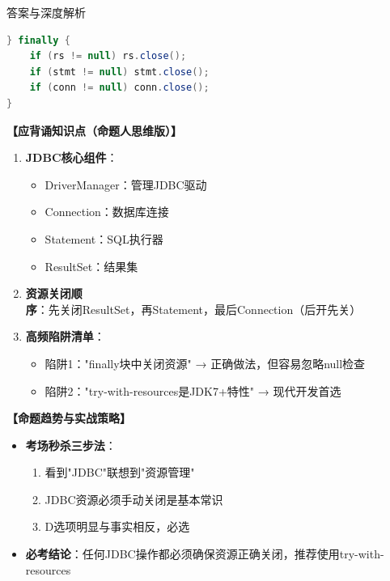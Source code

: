 \documentclass[12pt, a4paper]{ctexart}
\begin{document}
\begin{enumerate}[label=\textbf{\arabic*.}]
\begin{bluebox}{答案与深度解析}
\begin{itemize}[label={}, leftmargin=*, nosep]
\begin{itemize}[label={}, nosep]
\begin{lstlisting}[language=Java]
} finally {
    if (rs != null) rs.close();
    if (stmt != null) stmt.close();
    if (conn != null) conn.close();
}
      \end{lstlisting}
					  \end{itemize}
					  \end{itemize}
\textbf{【应背诵知识点（命题人思维版）】}
		      \begin{enumerate}[label={}, leftmargin=*, nosep]
			      \item \textbf{JDBC核心组件}：
			            \begin{itemize}[label={}, nosep]
				            \item DriverManager：管理JDBC驱动
				            \item Connection：数据库连接
				            \item Statement：SQL执行器
				            \item ResultSet：结果集
			            \end{itemize}

			      \item \textbf{资源关闭顺序}：先关闭ResultSet，再Statement，最后Connection（后开先关）

			      \item \textbf{高频陷阱清单}：
			            \begin{itemize}[label={}, nosep]
				            \item 陷阱1："finally块中关闭资源" → 正确做法，但容易忽略null检查
				            \item 陷阱2："try-with-resources是JDK7+特性" → 现代开发首选
			            \end{itemize}
		      \end{enumerate}

		      \textbf{【命题趋势与实战策略】}
		      \begin{itemize}[label={}, leftmargin=*, nosep]
			      \item \textbf{考场秒杀三步法}：
			            \begin{enumerate}
				            \item 看到"JDBC"联想到"资源管理"
				            \item JDBC资源必须手动关闭是基本常识
				            \item D选项明显与事实相反，必选
			            \end{enumerate}

			      \item \textbf{必考结论}：任何JDBC操作都必须确保资源正确关闭，推荐使用try-with-resources
		      \end{itemize}
	      \end{bluebox}


\end{enumerate}
\end{document}
